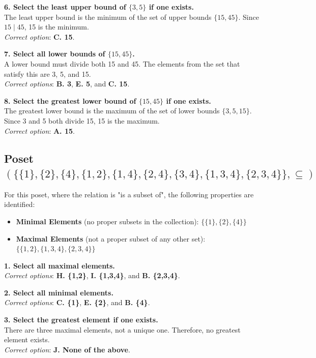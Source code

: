 \documentclass[10pt]{article}
\theoremstyle{definition}
\theoremstyle{plain}
\numberwithin{equation}{section}
\begin{document}
\vspace{1em}
\noindent\textbf{6. Select the least upper bound of $\{3,5\}$ if one exists.} \\
The least upper bound is the minimum of the set of upper bounds $\{15, 45\}$. Since $15 \mid 45$, 15 is the minimum. \\
\textit{Correct option}: \textbf{C. 15}.

\vspace{1em}
\noindent\textbf{7. Select all lower bounds of $\{15,45\}$.} \\
A lower bound must divide both 15 and 45. The elements from the set that satisfy this are 3, 5, and 15. \\
\textit{Correct options}: \textbf{B. 3}, \textbf{E. 5}, and \textbf{C. 15}.

\vspace{1em}
\noindent\textbf{8. Select the greatest lower bound of $\{15,45\}$ if one exists.} \\
The greatest lower bound is the maximum of the set of lower bounds $\{3, 5, 15\}$. Since 3 and 5 both divide 15, 15 is the maximum. \\
\textit{Correct option}: \textbf{A. 15}.

\subsection*{Poset $(\{\{1\},\{2\},\{4\},\{1,2\},\{1,4\},\{2,4\},\{3,4\},\{1,3,4\},\{2,3,4\}\}, \subseteq)$}
For this poset, where the relation is "is a subset of", the following properties are identified:
\begin{itemize}
  \item \textbf{Minimal Elements} (no proper subsets in the collection): $\{\{1\}, \{2\}, \{4\}\}$
  \item \textbf{Maximal Elements} (not a proper subset of any other set): $\{\{1,2\}, \{1,3,4\}, \{2,3,4\}\}$
\end{itemize}

\noindent\textbf{1. Select all maximal elements.} \\
\textit{Correct options}: \textbf{H. \{1,2\}}, \textbf{I. \{1,3,4\}}, and \textbf{B. \{2,3,4\}}.

\vspace{1em}
\noindent\textbf{2. Select all minimal elements.} \\
\textit{Correct options}: \textbf{C. \{1\}}, \textbf{E. \{2\}}, and \textbf{B. \{4\}}.

\vspace{1em}
\noindent\textbf{3. Select the greatest element if one exists.} \\
There are three maximal elements, not a unique one. Therefore, no greatest element exists. \\
\textit{Correct option}: \textbf{J. None of the above}.
\end{document}
